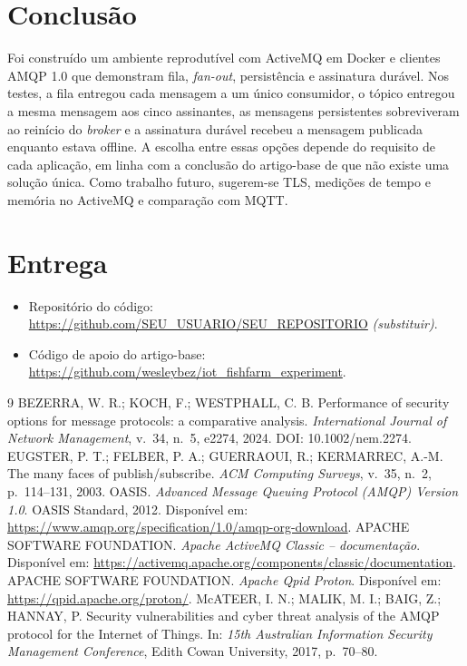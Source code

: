 \documentclass[12pt,a4paper]{article}
\begin{document}
\section{Conclusão}
Foi construído um ambiente reprodutível com ActiveMQ em Docker e clientes AMQP 1.0 que demonstram fila, \textit{fan-out}, persistência e assinatura durável. Nos testes, a fila entregou cada mensagem a um único consumidor, o tópico entregou a mesma mensagem aos cinco assinantes, as mensagens persistentes sobreviveram ao reinício do \textit{broker} e a assinatura durável recebeu a mensagem publicada enquanto estava offline. A escolha entre essas opções depende do requisito de cada aplicação, em linha com a conclusão do artigo-base de que não existe uma solução única. Como trabalho futuro, sugerem-se TLS, medições de tempo e memória no ActiveMQ e comparação com MQTT.

\section{Entrega}\label{sec:entrega}
\begin{itemize}
  \item Repositório do código: \url{https://github.com/SEU_USUARIO/SEU_REPOSITORIO} \textit{(substituir)}.
  \item Código de apoio do artigo-base: \url{https://github.com/wesleybez/iot_fishfarm_experiment}.
\end{itemize}

\begin{thebibliography}{9}
 BEZERRA, W. R.; KOCH, F.; WESTPHALL, C. B. Performance of security options for message protocols: a comparative analysis. \textit{International Journal of Network Management}, v.~34, n.~5, e2274, 2024. DOI: 10.1002/nem.2274.
 EUGSTER, P. T.; FELBER, P. A.; GUERRAOUI, R.; KERMARREC, A.-M. The many faces of publish/subscribe. \textit{ACM Computing Surveys}, v.~35, n.~2, p.~114--131, 2003.
 OASIS. \textit{Advanced Message Queuing Protocol (AMQP) Version 1.0}. OASIS Standard, 2012. Disponível em: \url{https://www.amqp.org/specification/1.0/amqp-org-download}.
 APACHE SOFTWARE FOUNDATION. \textit{Apache ActiveMQ Classic -- documentação}. Disponível em: \url{https://activemq.apache.org/components/classic/documentation}.
 APACHE SOFTWARE FOUNDATION. \textit{Apache Qpid Proton}. Disponível em: \url{https://qpid.apache.org/proton/}.
 McATEER, I. N.; MALIK, M. I.; BAIG, Z.; HANNAY, P. Security vulnerabilities and cyber threat analysis of the AMQP protocol for the Internet of Things. In: \textit{15th Australian Information Security Management Conference}, Edith Cowan University, 2017, p.~70--80.
\end{thebibliography}
\end{document}
